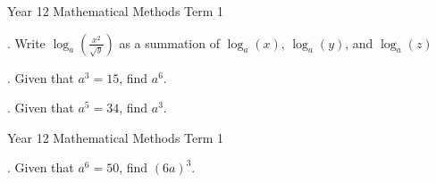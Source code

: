 \documentclass[12pt]{article}
\begin{document}
\noindent Year 12 Mathematical Methods \hfill Term 1

\vspace{10mm}. Write \(\log_a \left(\frac{x^2}{\sqrt{y}}\right)\) as a summation of \(\log_a(x)\), \(\log_a(y)\), and \(\log_a(z)\)\vspace{10mm}
\vspace{10mm} %
\noindent \makebox[\linewidth]{\dotfill} %
\vspace{10mm}
\noindent \makebox[\linewidth]{\dotfill}
\vspace{10mm}
\noindent \makebox[\linewidth]{\dotfill}

. Given that \( a^3 = 15 \), find \( a^6 \).\vspace{10mm}
\vspace{10mm} %
\noindent \makebox[\linewidth]{\dotfill} %
\vspace{10mm}
\noindent \makebox[\linewidth]{\dotfill}
\vspace{10mm}
\noindent \makebox[\linewidth]{\dotfill}

. Given that \( a^5 = 34 \), find \( a^3 \).\vspace{10mm}
\vspace{10mm} %
\noindent \makebox[\linewidth]{\dotfill} %
\vspace{10mm}
\noindent \makebox[\linewidth]{\dotfill}
\vspace{10mm}
\noindent \makebox[\linewidth]{\dotfill}

\vfill %
\flushleft

\newpage %

\noindent Year 12 Mathematical Methods \hfill Term 1

\vspace{5mm}. Given that \( a^6 = 50 \), find \( (6a)^3 \).\vspace{10mm}
\vspace{10mm} %
\noindent \makebox[\linewidth]{\dotfill} %
\vspace{10mm}
\noindent \makebox[\linewidth]{\dotfill}
\vspace{10mm}
\noindent \makebox[\linewidth]{\dotfill}
\end{document}

